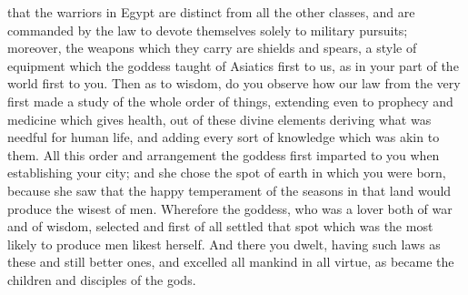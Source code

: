 \documentclass[12pt]{article}
\begin{document}
that the warriors in Egypt are distinct from all the other classes, and are commanded by the law to devote themselves solely to military pursuits; moreover, the weapons which they carry are shields and spears, a style of equipment which the goddess taught of Asiatics first to us, as in your part of the world first to you. Then as to wisdom, do you observe how our law from the very first made a study of the whole order of things, extending even to prophecy and medicine which gives health, out of these divine elements deriving what was needful for human life, and adding every sort of knowledge which was akin to them. All this order and arrangement the goddess first imparted to you when establishing your city; and she chose the spot of earth in which you were born, because she saw that the happy temperament of the seasons in that land would produce the wisest of men. Wherefore the goddess, who was a lover both of war and of wisdom, selected and first of all settled that spot which was the most likely to produce men likest herself. And there you dwelt, having such laws as these and still better ones, and excelled all mankind in all virtue, as became the children and disciples of the gods.
\end{document}
